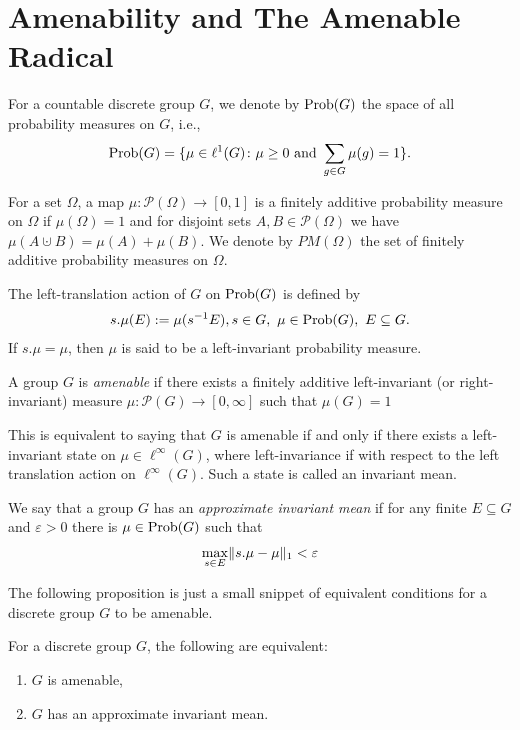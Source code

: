 \chapter{Amenability and The Amenable Radical}
For a countable discrete group $G$, we denote by $\operatorname{Prob}(G)$ the space of all probability measures on $G$, i.e., 
\begin{align*}
\operatorname{Prob}(G)=\{ \mu \in \ell^1(G) \colon \mu \geq 0 \ \text{and} \ \sum_{g \in G} \mu(g)=1\}.
\end{align*}

For a set $\Omega$, a map $\mu \colon \mathcal{P}(\Omega) \to [0,1]$ is a finitely additive probability measure on $\Omega$ if $\mu(\Omega)=1$ and for disjoint sets $A,B \in \mathcal{P}(\Omega)$ we have $\mu(A \cupdot B) = \mu(A) + \mu(B)$. We denote by $PM(\Omega)$ the set of finitely additive probability measures on $\Omega$.

\begin{definition}
The left-translation action of $G$ on $\operatorname{Prob}(G)$ is defined by 
\begin{align*}
s.\mu(E):=\mu(s^{-1}E), s \in G,\ \mu \in \operatorname{Prob}(G), \ E \subseteq G.
\end{align*}
If $s.\mu=\mu$, then $\mu$ is said to be a left-invariant probability measure.
\end{definition}

\begin{definition}
A group $G$ is \emph{amenable} if there exists a finitely additive left-invariant (or right-invariant) measure $\mu \colon \mathcal{P}(G) \to [0,\infty]$ such that $\mu(G)=1$
\end{definition}
\begin{remark}
This is equivalent to saying that $G$ is amenable if and only if there exists a left-invariant state on $\mu \in \ell^{\infty}(G)$, where left-invariance if with respect to the left translation action on $\ell^{\infty}(G)$. Such a state is called an invariant mean.
\end{remark}

\begin{definition}
We say that a group $G$ has an \emph{approximate invariant mean} if for any finite $E \subseteq G$ and $\varepsilon>0$ there is $\mu \in \operatorname{Prob}(G)$ such that
\begin{align*}
\max_{s \in E} \lVert s.\mu - \mu \rVert_1 < \varepsilon
\end{align*}
\end{definition}

The following proposition is just a small snippet of equivalent conditions for a discrete group $G$ to be amenable.
\begin{proposition}\label{2.6.8 amenab}
For a discrete group $G$, the following are equivalent:
\begin{enumerate}
\item $G$ is amenable,
\item $G$ has an approximate invariant mean.
\end{enumerate}
\end{proposition}

